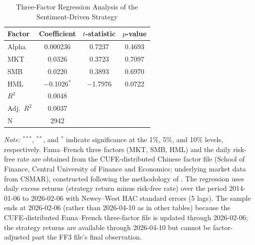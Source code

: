 \documentclass[AER]{AEA}
\begin{document}
\begin{table}[h!]
    \centering
    \caption{Three-Factor Regression Analysis of the Sentiment-Driven Strategy}
    \label{tab:factor_regression}
    \setlength{\tabcolsep}{4pt}
    \small
    \begin{tabular}{lccc}
    \toprule
    Factor & Coefficient & $t$-statistic & $p$-value \\
    \midrule
    Alpha & 0.000236 & 0.7237 & 0.4693 \\
    MKT & 0.0326 & 0.3723 & 0.7097 \\
    SMB & 0.0220 & 0.3893 & 0.6970 \\
    HML & $-$0.1026$^{*}$ & $-$1.7976 & 0.0722 \\
    $R^2$ & 0.0048 & & \\
    Adj.~$R^2$ & 0.0037 & & \\
    N & 2942 & & \\
    \bottomrule
    \end{tabular}

    \vspace{0.2cm}
    \footnotesize
    \textit{Note:} $^{***}$, $^{**}$, and $^{*}$ indicate significance at the 1\%, 5\%, and 10\% levels, respectively. Fama--French three factors (MKT, SMB, HML) and the daily risk-free rate are obtained from the CUFE-distributed Chinese factor file (School of Finance, Central University of Finance and Economics; underlying market data from CSMAR), constructed following the methodology of \citet{fama1993common}. The regression uses daily excess returns (strategy return minus risk-free rate) over the period 2014-01-06 to 2026-02-06 with Newey--West HAC standard errors (5 lags). The sample ends at 2026-02-06 (rather than 2026-04-10 as in other tables) because the CUFE-distributed Fama--French three-factor file is updated through 2026-02-06; the strategy returns are available through 2026-04-10 but cannot be factor-adjusted past the FF3 file's final observation.
\end{table}

\end{document}
